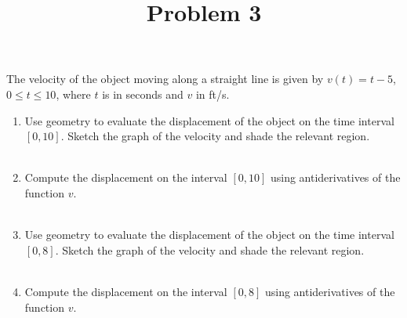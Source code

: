 \documentclass{ximera}
\title[Problem 3]{Problem 3}
\begin{document}
\begin{abstract} \end{abstract}
\maketitle

\begin{problem}
The velocity of the object moving along a straight line is given by
$v(t)=t-5$, $0\le t\le10$, where $t$ is in seconds and $v$ in ft/s.
\begin{enumerate}
	\item Use geometry to evaluate the displacement of the object on the time interval $[0,10]$. 
	Sketch the graph of the velocity and shade the relevant region.\\ \\

	\item Compute the displacement on the interval $[0,10]$ using antiderivatives of the function $v$.  \\ \\

	\item Use geometry to evaluate the displacement of the object on the time interval $[0,8]$.
	Sketch the graph of the velocity and shade the relevant region.\\ \\

	\item Compute the displacement on the interval $[0,8]$ using antiderivatives of the function $v$.  \\ \\
\end{enumerate}
\end{problem}
\end{document}

